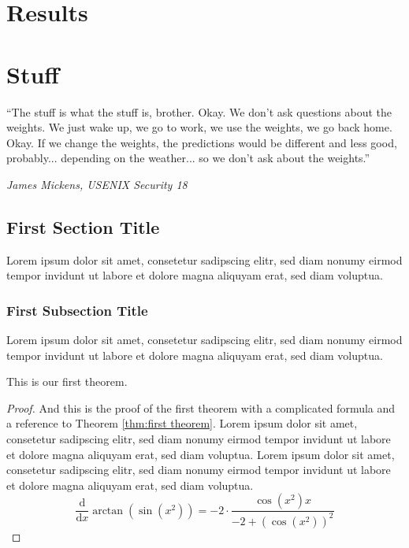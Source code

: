 \documentclass[a4paper, oneside]{discothesis}
\begin{document}
\chapter{Results}

\chapter{Stuff}


\newpage

\begin{flushright}
	``The stuff is what the stuff is, brother. Okay. We don't ask questions about the weights. We just wake up, we go to work, we use the weights, we go back home. Okay. If we change the weights, the predictions would be different and less good, probably... depending on the weather... so we don't ask about the weights.''
	
	\textit{\textemdash{} James Mickens, USENIX Security 18~\cite{218395}}
\end{flushright}

\bigskip

\section{First Section Title}

Lorem ipsum dolor sit amet, consetetur sadipscing elitr, sed diam nonumy eirmod tempor invidunt ut labore et dolore magna aliquyam erat, sed diam voluptua.

\subsection{First Subsection Title}

Lorem ipsum dolor sit amet, consetetur sadipscing elitr, sed diam nonumy eirmod tempor invidunt ut labore et dolore magna aliquyam erat, sed diam voluptua.

\begin{theorem} \label{thm:first theorem}
	This is our first theorem.
\end{theorem}

\begin{proof}
	And this is the proof of the first theorem with a complicated formula and a reference to Theorem \ref{thm:first theorem}. Lorem ipsum dolor sit amet, consetetur sadipscing elitr, sed diam nonumy eirmod tempor invidunt ut labore et dolore magna aliquyam erat, sed diam voluptua. Lorem ipsum dolor sit amet, consetetur sadipscing elitr, sed diam nonumy eirmod tempor invidunt ut labore et dolore magna aliquyam erat, sed diam voluptua.
	\begin{equation}
		{\frac {\mathrm d}{\mathrm dx}}\arctan(\sin({x}^{2}))=-2 \cdot {\frac {\cos({x}^{2})x}{-2+\left (\cos({x}^{2})\right )^{2}}}
	\end{equation}	
\end{proof}
\end{document}
